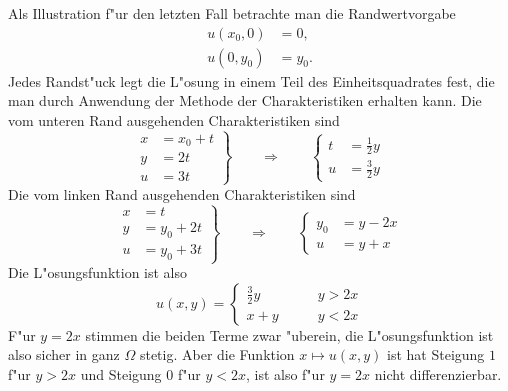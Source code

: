 Als Illustration f"ur den letzten Fall betrachte man die Randwertvorgabe
\begin{align*}
u(x_0,0)&=0,\\
u(0,y_0)&=y_0.
\end{align*}
Jedes Randst"uck legt die L"osung in einem Teil des Einheitsquadrates
fest, die man durch Anwendung der Methode der Charakteristiken erhalten
kann. Die vom unteren Rand ausgehenden Charakteristiken sind
\[
\left.
\begin{aligned}
x&=x_0+t\\
y&=2t\\
u&=3t
\end{aligned}
\right\}
\qquad\Rightarrow\qquad
\left\{
\begin{aligned}
t&=\frac12y\\
u&=\frac32y
\end{aligned}
\right.
\]
Die vom linken Rand ausgehenden Charakteristiken sind 
\[
\left.
\begin{aligned}
x&=t\\
y&=y_0+2t\\
u&=y_0+3t
\end{aligned}
\right\}
\qquad\Rightarrow\qquad
\left\{
\begin{aligned}
y_0&=y-2x\\
u&=y+x
\end{aligned}
\right.
\]
Die L"osungsfunktion ist also
\[
u(x,y)=\begin{cases}
\frac32y&\qquad y>2x\\
x+y&\qquad y<2x
\end{cases}
\]
F"ur $y=2x$ stimmen die beiden Terme zwar "uberein, die L"osungsfunktion
ist also sicher in ganz $\Omega$ stetig.
Aber die
Funktion $x\mapsto u(x,y)$ ist hat Steigung $1$ f"ur $y>2x$ und
Steigung 0 f"ur $y<2x$, ist also f"ur $y=2x$ nicht differenzierbar.
